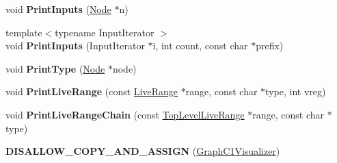 \begin{DoxyCompactItemize}
\item 
void {\bfseries Print\+Inputs} (\hyperlink{classv8_1_1internal_1_1compiler_1_1_node}{Node} $\ast$n)\hypertarget{classv8_1_1internal_1_1compiler_1_1_graph_c1_visualizer_ac32311e016ba0f8dacce23c1652d6f85}{}\label{classv8_1_1internal_1_1compiler_1_1_graph_c1_visualizer_ac32311e016ba0f8dacce23c1652d6f85}

\item 
{\footnotesize template$<$typename Input\+Iterator $>$ }\\void {\bfseries Print\+Inputs} (Input\+Iterator $\ast$i, int count, const char $\ast$prefix)\hypertarget{classv8_1_1internal_1_1compiler_1_1_graph_c1_visualizer_aafbfb3373fb763ec7039e22d56587f6a}{}\label{classv8_1_1internal_1_1compiler_1_1_graph_c1_visualizer_aafbfb3373fb763ec7039e22d56587f6a}

\item 
void {\bfseries Print\+Type} (\hyperlink{classv8_1_1internal_1_1compiler_1_1_node}{Node} $\ast$node)\hypertarget{classv8_1_1internal_1_1compiler_1_1_graph_c1_visualizer_aae8c29f26d72afbe45759b32bcd24631}{}\label{classv8_1_1internal_1_1compiler_1_1_graph_c1_visualizer_aae8c29f26d72afbe45759b32bcd24631}

\item 
void {\bfseries Print\+Live\+Range} (const \hyperlink{classv8_1_1internal_1_1compiler_1_1_live_range}{Live\+Range} $\ast$range, const char $\ast$type, int vreg)\hypertarget{classv8_1_1internal_1_1compiler_1_1_graph_c1_visualizer_a286631be4ba9d2dcca574054ae93ad98}{}\label{classv8_1_1internal_1_1compiler_1_1_graph_c1_visualizer_a286631be4ba9d2dcca574054ae93ad98}

\item 
void {\bfseries Print\+Live\+Range\+Chain} (const \hyperlink{classv8_1_1internal_1_1compiler_1_1_top_level_live_range}{Top\+Level\+Live\+Range} $\ast$range, const char $\ast$type)\hypertarget{classv8_1_1internal_1_1compiler_1_1_graph_c1_visualizer_a9c6398d7c5e8b591dadd67ed943378b0}{}\label{classv8_1_1internal_1_1compiler_1_1_graph_c1_visualizer_a9c6398d7c5e8b591dadd67ed943378b0}

\item 
{\bfseries D\+I\+S\+A\+L\+L\+O\+W\+\_\+\+C\+O\+P\+Y\+\_\+\+A\+N\+D\+\_\+\+A\+S\+S\+I\+GN} (\hyperlink{classv8_1_1internal_1_1compiler_1_1_graph_c1_visualizer}{Graph\+C1\+Visualizer})\hypertarget{classv8_1_1internal_1_1compiler_1_1_graph_c1_visualizer_a2417852d3b75feaae489356aacaf5129}{}\label{classv8_1_1internal_1_1compiler_1_1_graph_c1_visualizer_a2417852d3b75feaae489356aacaf5129}

\end{DoxyCompactItemize}
